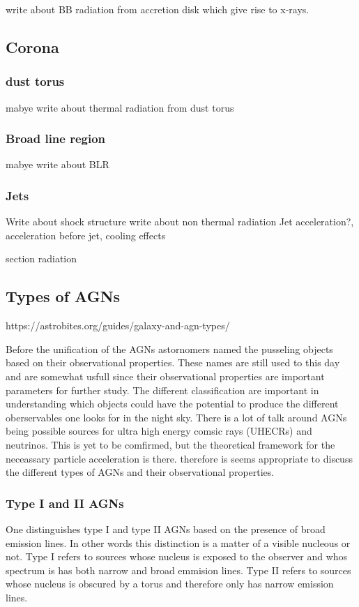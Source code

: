\documentclass{article}
\begin{document}
write about BB radiation from accretion disk which give rise to x-rays. 

\subsection{Corona}

\subsubsection{dust torus}
mabye write about thermal radiation from dust torus

\subsubsection{Broad line region}
mabye write about BLR


\subsubsection{Jets}
Write about shock structure
write about non thermal radiation
Jet acceleration?, acceleration before jet, cooling effects



section radiation




\subsection{Types of AGNs}

https://astrobites.org/guides/galaxy-and-agn-types/

Before the unification of the AGNs astornomers named the pusseling objects based on their observational properties. These 
names are still used to this day and are somewhat usfull since their observational properties are important parameters for further study. 
The different classification are important in understanding which objects could have the potential to produce the different oberservables one 
looks for in the night sky. There is a lot of talk around AGNs being possible sources for ultra high energy comsic rays (UHECRs) and neutrinos.
This is yet to be comfirmed, but the theoretical framework for the neceassary particle acceleration is there. therefore is seems appropriate to
discuss the different types of AGNs and their observational properties.

\subsubsection{Type I and II AGNs}
One distinguishes type I and type II AGNs based on the presence of broad emission lines. In other words this distinction is
a matter of a visible nucleous or not. Type I refers to sources whose nucleus is exposed to the observer and whos spectrum is 
has both narrow and broad emmision lines. Type II refers to sources whose nucleus is obscured by a torus and therefore only has narrow emission lines.
\end{document}
